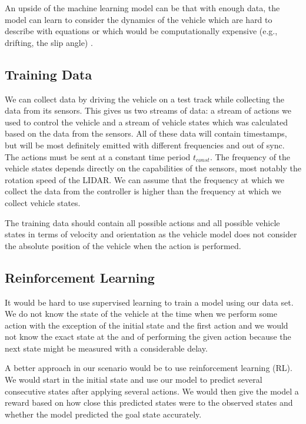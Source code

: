 An upside of the machine learning model can be that with enough data, the model can learn to consider the dynamics of the vehicle which are hard to describe with equations or which would be computationally expensive (e.g., drifting, the slip angle) \cite{}.

\subsection{Training Data}

We can collect data by driving the vehicle on a test track while collecting the data from its sensors. This gives us two streams of data: a stream of actions we used to control the vehicle and a stream of vehicle states which was calculated based on the data from the sensors. All of these data will contain timestamps, but will be most definitely emitted with different frequencies and out of sync. The actions must be sent at a constant time period $t_{const}$. The frequency of the vehicle states depends directly on the capabilities of the sensors, most notably the rotation speed of the LIDAR. We can assume that the frequency at which we collect the data from the controller is higher than the frequency at which we collect vehicle states.

The training data should contain all possible actions and all possible vehicle states in terms of velocity and orientation as the vehicle model does not consider the absolute position of the vehicle when the action is performed.

\subsection{Reinforcement Learning}

It would be hard to use supervised learning to train a model using our data set. We do not know the state of the vehicle at the time when we perform some action with the exception of the initial state and the first action and we would not know the exact state at the and of performing the given action because the next state might be measured with a considerable delay.

A better approach in our scenario would be to use reinforcement learning (RL). We would start in the initial state and use our model to predict several consecutive states after applying several actions. We would then give the model a reward based on how close this predicted states were to the observed states and whether the model predicted the goal state accurately.

